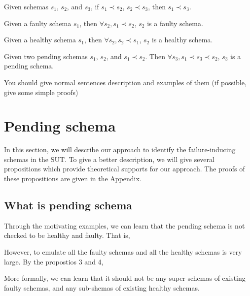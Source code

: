 \begin{proposition}\label{pro:subsumetrans}
Given schemas $s_{1}$, $s_{2}$, and $s_{3}$, if $s_{1} \prec s_{2}$, $s_{2} \prec s_{3}$, then $s_{1} \prec s_{3}$.
\end{proposition}




\begin{proposition}\label{pro:superoffaulty}
Given a faulty schema $s_{1}$, then $\forall s_{2}, s_{1} \prec s_{2}$, $s_{2}$ is a faulty schema.
\end{proposition}


\begin{proposition}\label{pro:subofhealthy}
Given a healthy schema $s_{1}$, then $\forall s_{2}, s_{2} \prec s_{1}$, $s_{2}$ is a healthy schema.
\end{proposition}


\begin{proposition}\label{pro:pending}
Given two pending schemas $s_{1}$, $s_{2}$, and $s_{1} \prec s_{2}$. Then $\forall s_{3}, s_{1} \prec s_{3} \prec s_{2}$, $s_{3}$ is a pending schema.
\end{proposition}


You should give normal sentences description and examples of them (if possible, give some simple proofs)

\section{Pending schema}\label{sec:pending}
In this section, we will describe our approach to identify the failure-inducing schemas in the SUT. To give a better description, we will give several propositions which provide theoretical supports for our approach. The proofs of these propositions are given in the Appendix.

\subsection{What is pending schema}
Through the motivating examples, we can learn that the pending schema is not checked to be healthy and faulty. That is,

However, to emulate all the faulty schemas and all the healthy schemas is very large. By the propostios 3 and 4,

More formally, we can learn that it should not be any super-schemas of existing faulty schemas, and any sub-shemas of existing healthy schemas.


